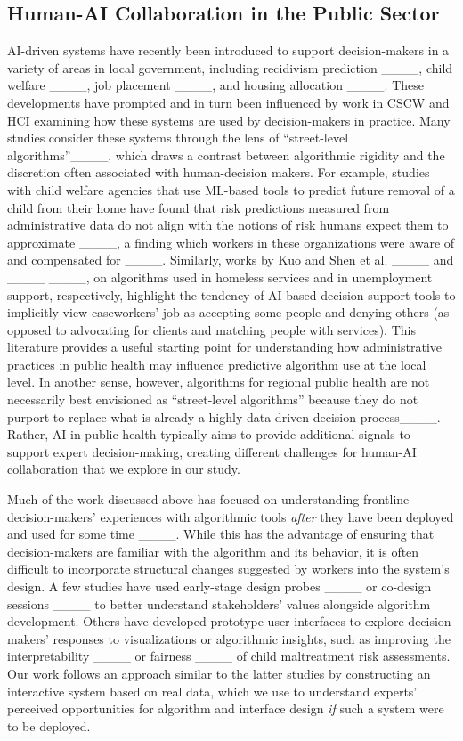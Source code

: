 \subsection{Human-AI Collaboration in the Public Sector}

AI-driven systems have recently been introduced to support decision-makers in a variety of areas in local government, including recidivism prediction ____, child welfare ____, job placement ____, and housing allocation ____. These developments have prompted and in turn been influenced by work in CSCW and HCI examining how these systems are used by decision-makers in practice. Many studies consider these systems through the lens of ``street-level algorithms''____, which draws a contrast between algorithmic rigidity and the discretion often associated with human-decision makers.
For example, studies with child welfare agencies that use ML-based tools to predict future removal of a child from their home have found that risk predictions measured from administrative data do not align with the notions of risk humans expect them to approximate ____, a finding which workers in these organizations were aware of and compensated for ____. Similarly, works by Kuo and Shen et al. ____ and ____ ____, on algorithms used in homeless services and in unemployment support, respectively, highlight the tendency of AI-based decision support tools to implicitly view caseworkers' job as accepting some people and denying others (as opposed to advocating for clients and matching people with services). This literature provides a useful starting point for understanding how administrative practices in public health may influence predictive algorithm use at the local level. In another sense, however, algorithms for regional public health are not necessarily best envisioned as ``street-level algorithms'' because they do not purport to replace what is already a highly data-driven decision process____. Rather, AI in public health typically aims to provide additional signals to support expert decision-making, creating different challenges for human-AI collaboration that we explore in our study.

Much of the work discussed above has focused on understanding frontline decision-makers' experiences with algorithmic tools \textit{after} they have been deployed and used for some time ____. While this has the advantage of ensuring that decision-makers are familiar with the algorithm and its behavior, it is often difficult to incorporate structural changes suggested by workers into the system's design. A few studies have used early-stage design probes ____ or co-design sessions ____ to better understand stakeholders' values alongside algorithm development. Others have developed prototype user interfaces to explore decision-makers' responses to visualizations or algorithmic insights, such as improving the interpretability ____ or fairness ____ of child maltreatment risk assessments. Our work follows an approach similar to the latter studies by constructing an interactive system based on real data, which we use to understand experts' perceived opportunities for algorithm and interface design \textit{if} such a system were to be deployed.


